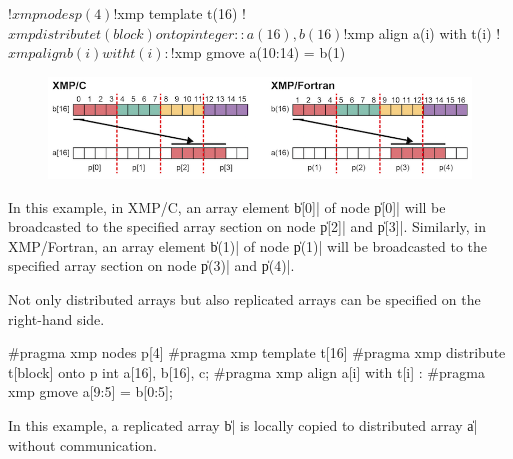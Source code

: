 \begin{XFexample}
!$xmp nodes p(4)
!$xmp template t(16)
!$xmp distribute t(block) onto p
integer :: a(16), b(16)
!$xmp align a(i) with t(i)
!$xmp align b(i) with t(i)
     :
!$xmp gmove
  a(10:14) = b(1)
\end{XFexample}

\begin{figure}
  \centering
  \includegraphics[width=\textwidth]{figs/gmove_one_element.png}
\end{figure}

In this example, in XMP/C, an array element \|b[0]| of node \|p[0]| will be
broadcasted to the specified array section on node \|p[2]| and
\|p[3]|. Similarly, in XMP/Fortran, an array element \|b(1)| of node
\|p(1)| will be broadcasted to the specified array section on node \|p(3)| and \|p(4)|.


Not only distributed arrays but also replicated arrays can be specified
on the right-hand side.

\begin{XCexample}
 #pragma xmp nodes p[4]
 #pragma xmp template t[16]
 #pragma xmp distribute t[block] onto p
 int a[16], b[16], c;
 #pragma xmp align a[i] with t[i]
      :
#pragma xmp gmove
   a[9:5] = b[0:5];
\end{XCexample}


In this example, a replicated array \|b| is locally copied to
distributed array \|a| without communication.


